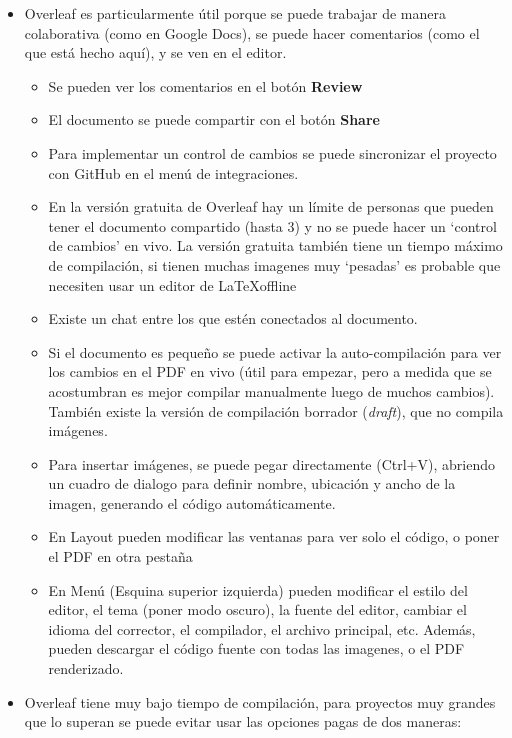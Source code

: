 \begin{itemize}
    \item Overleaf es particularmente útil porque se puede trabajar de manera colaborativa (como en Google Docs), se puede hacer comentarios (como el que está hecho aquí), y se ven en el editor.
    \begin{itemize}
        \item Se pueden ver los comentarios en el botón \textbf{Review}
        \item El documento se puede compartir con el botón \textbf{Share}
        \item Para implementar un control de cambios se puede sincronizar el proyecto con GitHub en el menú de integraciones.
        \item En la versión gratuita de Overleaf hay un límite de personas que pueden tener el documento compartido (hasta 3) y no se puede hacer un `control de cambios' en vivo. La versión gratuita también tiene un tiempo máximo de compilación, si tienen muchas imagenes muy `pesadas' es probable que necesiten usar un editor de \LaTeX offline
        \item Existe un chat entre los que estén conectados al documento. 
        \item Si el documento es pequeño se puede activar la auto-compilación para ver los cambios en el PDF en vivo (útil para empezar, pero a medida que se acostumbran es mejor compilar manualmente luego de muchos cambios). También existe la versión de compilación borrador (\textit{draft}), que no compila imágenes.
        \item Para insertar imágenes, se puede pegar directamente (Ctrl+V), abriendo un cuadro de dialogo para definir nombre, ubicación y ancho de la imagen, generando el código automáticamente.
        \item En Layout pueden modificar las ventanas para ver solo el código, o poner el PDF en otra pestaña
        \item En Menú (Esquina superior izquierda) pueden modificar el estilo del editor, el tema (poner modo oscuro), la fuente del editor, cambiar el idioma del corrector, el compilador, el archivo principal, etc. Además, pueden descargar el código fuente con todas las imagenes, o el PDF renderizado.
    \end{itemize}
    \item Overleaf tiene muy bajo tiempo de compilación, para proyectos muy grandes que lo superan se puede evitar usar las opciones pagas de dos maneras:
    \begin{itemize}

\end{itemize}
\end{itemize}

